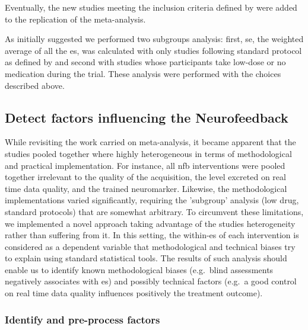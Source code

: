 Eventually, the new studies meeting the inclusion criteria defined by \citeauthor{Cortese2016} were added to the replication of the meta-analysis. 

As initially suggested we performed two subgroups analysis: first, \gls{se}, the weighted average of all the \gls{es}, was calculated with only studies following 
standard protocol as defined by \citet{Arns2014} and second with studies whose participants take low-dose or no medication during the trial. 
These analysis were performed with the choices described above. 

\subsection{Detect factors influencing the Neurofeedback}

While revisiting the work carried on meta-analysis, it became apparent that the studies pooled together where highly heterogeneous 
in terms of methodological and practical implementation. For instance, all \gls{nfb} interventions were pooled together irrelevant to the 
quality of the acquisition, the level excreted on real time data quality, and the trained neuromarker. 
Likewise, the methodological implementations varied significantly, requiring the 'subgroup' analysis (low drug, standard protocols) 
that are somewhat arbitrary. To circumvent these limitations, we implemented a novel approach taking advantage of the studies heterogeneity 
rather than suffering from it. In this setting, the within-\gls{es} of each intervention is considered as a dependent variable that
methodological and technical biases try to explain using standard statistical tools. The results of such analysis should enable us to identify 
known methodological biases (e.g.\ blind assessments negatively associates with \gls{es}) 
and possibly technical factors (e.g.\ a good control on real time data quality influences positively the treatment outcome). 

\subsubsection{Identify and pre-process factors}

